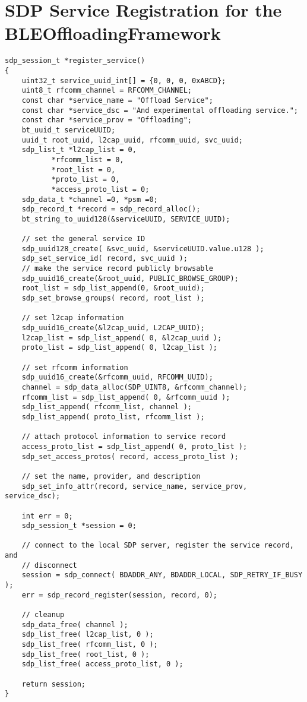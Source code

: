 \chapter{SDP Service Registration for the BLEOffloadingFramework}
\label{appendix:sdpservice}

\lstset{language=c,caption=SDP Service Implementation, label=lst:uuid}
\begin{lstlisting}
sdp_session_t *register_service()
{
	uint32_t service_uuid_int[] = {0, 0, 0, 0xABCD};
	uint8_t rfcomm_channel = RFCOMM_CHANNEL;
	const char *service_name = "Offload Service";
	const char *service_dsc = "And experimental offloading service.";
	const char *service_prov = "Offloading";
	bt_uuid_t serviceUUID;
	uuid_t root_uuid, l2cap_uuid, rfcomm_uuid, svc_uuid;
	sdp_list_t *l2cap_list = 0,
		   *rfcomm_list = 0,
		   *root_list = 0,
		   *proto_list = 0,
		   *access_proto_list = 0;
	sdp_data_t *channel =0, *psm =0;
	sdp_record_t *record = sdp_record_alloc();
	bt_string_to_uuid128(&serviceUUID, SERVICE_UUID);

	// set the general service ID
	sdp_uuid128_create( &svc_uuid, &serviceUUID.value.u128 );
   	sdp_set_service_id( record, svc_uuid );
   	// make the service record publicly browsable
   	sdp_uuid16_create(&root_uuid, PUBLIC_BROWSE_GROUP);
   	root_list = sdp_list_append(0, &root_uuid);
   	sdp_set_browse_groups( record, root_list );

   	// set l2cap information
   	sdp_uuid16_create(&l2cap_uuid, L2CAP_UUID);
   	l2cap_list = sdp_list_append( 0, &l2cap_uuid );
   	proto_list = sdp_list_append( 0, l2cap_list );

   	// set rfcomm information
   	sdp_uuid16_create(&rfcomm_uuid, RFCOMM_UUID);
   	channel = sdp_data_alloc(SDP_UINT8, &rfcomm_channel);
   	rfcomm_list = sdp_list_append( 0, &rfcomm_uuid );
   	sdp_list_append( rfcomm_list, channel );
   	sdp_list_append( proto_list, rfcomm_list );

   	// attach protocol information to service record
   	access_proto_list = sdp_list_append( 0, proto_list );
   	sdp_set_access_protos( record, access_proto_list );

   	// set the name, provider, and description
   	sdp_set_info_attr(record, service_name, service_prov, service_dsc);

	int err = 0;
   	sdp_session_t *session = 0;

   	// connect to the local SDP server, register the service record, and 
   	// disconnect
   	session = sdp_connect( BDADDR_ANY, BDADDR_LOCAL, SDP_RETRY_IF_BUSY );
   	err = sdp_record_register(session, record, 0);

   	// cleanup
   	sdp_data_free( channel );
   	sdp_list_free( l2cap_list, 0 );
   	sdp_list_free( rfcomm_list, 0 );
   	sdp_list_free( root_list, 0 );
   	sdp_list_free( access_proto_list, 0 );

	return session;
}
\end{lstlisting}